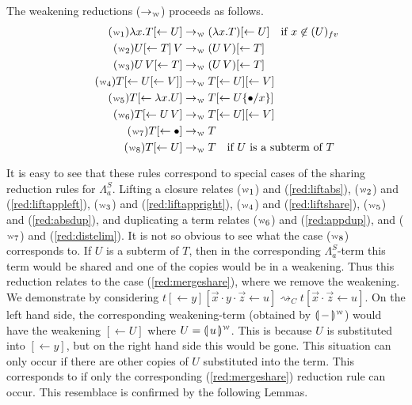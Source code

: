 \documentclass[a4paper,UKenglish,cleveref, autoref]{lipics-v2019}
\newcommand{\FALC}{\Lambda^{S}_{a}}
\newcommand{\fv}[1]{(#1)_{fv}}
\newcommand{\abs}[2]{\lambda #1 . #2}
\newcommand{\app}[2]{#1 \, #2}
\newcommand{\share}[3]{#1 [#2 \leftarrow #3]}
\newcommand{\sub}[3]{#1 \{ #2 / #3 \}}
\newcommand{\weaksymbol}{\mbox{\tiny $\mathcal{W}$}}
\newcommand{\compweak}[1]{\llparenthesis \, #1 \, \rrparenthesis^{\weaksymbol}}
\begin{document}
\begin{definition}
The weakening reductions ($\rightarrow_{\weaksymbol}$) proceeds as follows.
\begingroup
\allowdisplaybreaks
\begin{align*}
	\tag{$\weaksymbol_{1}$}
	\abs{x}{\share{T}{}{U}} &\rightarrow_{\weaksymbol} (\abs{x}{T})\share{}{}{U} \quad \text{if } x \not\in \fv{U} \\
	\tag{$\weaksymbol_{2}$}
	\app{\share{U}{}{T}}{V} &\rightarrow_{\weaksymbol} (\app{U}{V}) \share{}{}{T} \\
	\tag{$\weaksymbol_{3}$}
	\app{U}{\share{V}{}{T}} &\rightarrow_{\weaksymbol} (\app{U}{V}) \share{}{}{T} \\
	\tag{$\weaksymbol_{4}$}
	\share{T}{}{\share{U}{}{V}} &\rightarrow_{\weaksymbol} \share{T}{}{U} \share{}{}{V} \\
	\tag{$\weaksymbol_{5}$}
	\share{T}{}{\abs{x}{U}} &\rightarrow_{\weaksymbol} \share{T}{}{U \sub{}{\bullet}{x}} \\
	\tag{$\weaksymbol_{6}$}
	\share{T}{}{\app{U}{V}} &\rightarrow_{\weaksymbol} T \share{}{}{U} \share{}{}{V} \\
	\tag{$\weaksymbol_{7}$}
	\share{T}{}{\bullet} &\rightarrow_{\weaksymbol} T \\
	\tag{$\weaksymbol_{8}$}
	\share{T}{}{U} &\rightarrow_{\weaksymbol} T \quad \text{if $U$ is a subterm of $T$}
\end{align*}
\endgroup
\end{definition}
\noindent It is easy to see that these rules correspond to special cases of the sharing reduction rules for $\FALC$. Lifting a closure relates ($\weaksymbol_{1}$) and (\ref{red:liftabs}), ($\weaksymbol_{2}$) and  (\ref{red:liftappleft}), ($\weaksymbol_{3}$) and (\ref{red:liftappright}), ($\weaksymbol_{4}$) and (\ref{red:liftshare}), ($\weaksymbol_{5}$) and (\ref{red:absdup}), and duplicating a term relates ($\weaksymbol_{6}$) and (\ref{red:appdup}), and  ($\weaksymbol_{7}$) and (\ref{red:distelim}). It is not so obvious to see what the case ($\weaksymbol_{8}$) corresponds to. If $U$ is a subterm of $T$, then in the corresponding $\FALC$-term this term would be shared and one of the copies would be in a weakening. Thus this reduction relates to the case (\ref{red:mergeshare}), where we remove the weakening. We demonstrate by considering $t \share{}{}{y} \share{}{\vec{x} \cdot y \cdot \vec{z}}{u}  \rightsquigarrow_{C} t \share{}{\vec{x} \cdot \vec{z}}{u}$. On the left hand side, the corresponding weakening-term (obtained by $\compweak{-}$) would have the weakening $\share{}{}{U}$ where $U = \compweak{u}$. This is because $U$ is substituted into $\share{}{}{y}$, but on the right hand side this would be gone. This situation can only occur if there are other copies of $U$ substituted into the term. This corresponds to if only the corresponding (\ref{red:mergeshare}) reduction rule can occur. This resemblace is confirmed by the following Lemmas.
\end{document}
